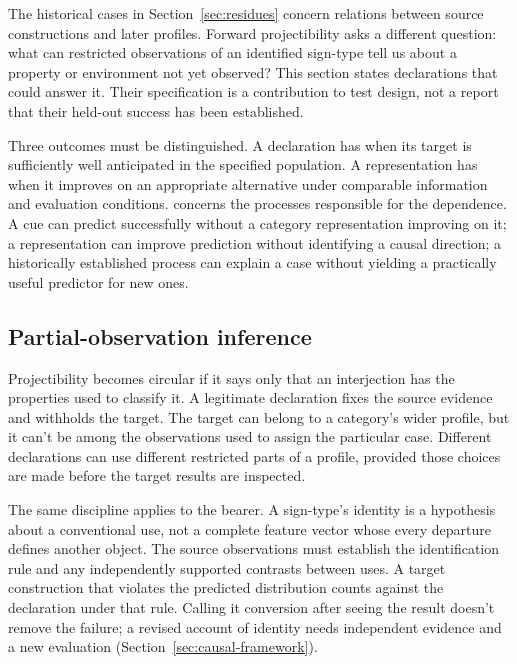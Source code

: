 \documentclass[12pt]{article}
\begin{document}
The historical cases in Section~\ref{sec:residues} concern relations between source constructions and later profiles. Forward projectibility asks a different question: what can restricted observations of an identified sign-type tell us about a property or environment not yet observed? This section states declarations that could answer it. Their specification is a contribution to test design, not a report that their held-out success has been established.

Three outcomes must be distinguished. A declaration has  when its target is sufficiently well anticipated in the specified population. A representation has  when it improves on an appropriate alternative under comparable information and evaluation conditions.  concerns the processes responsible for the dependence. A cue can predict successfully without a category representation improving on it; a representation can improve prediction without identifying a causal direction; a historically established process can explain a case without yielding a practically useful predictor for new ones.

\subsection{Partial-observation inference}\label{sec:proj-partial}

Projectibility becomes circular if it says only that an interjection has the properties used to classify it. A legitimate declaration fixes the source evidence and withholds the target. The target can belong to a category's wider profile, but it can't be among the observations used to assign the particular case. Different declarations can use different restricted parts of a profile, provided those choices are made before the target results are inspected.

The same discipline applies to the bearer. A sign-type's identity is a hypothesis about a conventional use, not a complete feature vector whose every departure defines another object. The source observations must establish the identification rule and any independently supported contrasts between uses. A target construction that violates the predicted distribution counts against the declaration under that rule. Calling it conversion after seeing the result doesn't remove the failure; a revised account of identity needs independent evidence and a new evaluation (Section~\ref{sec:causal-framework}).
\end{document}
